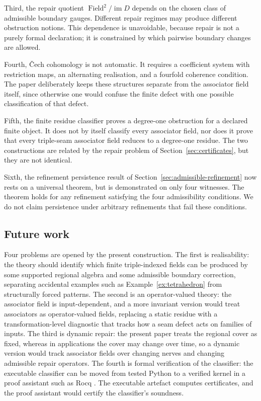 \documentclass[11pt]{article}
\newcommand{\im}{\operatorname{im}}
\newcommand{\Field}{\operatorname{Field}}
\begin{document}
Third, the repair quotient \(\Field^2/\im D\) depends on the chosen class of admissible boundary gauges. Different repair regimes may produce different obstruction notions. This dependence is unavoidable, because repair is not a purely formal declaration; it is constrained by which pairwise boundary changes are allowed.

Fourth, \v{C}ech cohomology is not automatic. It requires a coefficient system with restriction maps, an alternating realisation, and a fourfold coherence condition. The paper deliberately keeps these structures separate from the associator field itself, since otherwise one would confuse the finite defect with one possible classification of that defect.

Fifth, the finite residue classifier proves a degree-one obstruction for a declared finite object. It does not by itself classify every associator field, nor does it prove that every triple-seam associator field reduces to a degree-one residue. The two constructions are related by the repair problem of Section~\ref{sec:certificates}, but they are not identical.

Sixth, the refinement persistence result of Section~\ref{sec:admissible-refinement} now rests on a universal theorem, but is demonstrated on only four witnesses. The theorem holds for any refinement satisfying the four admissibility conditions. We do not claim persistence under arbitrary refinements that fail these conditions.

\subsection{Future work}

Four problems are opened by the present construction. The first is realisability: the theory should identify which finite triple-indexed fields can be produced by some supported regional algebra and some admissible boundary correction, separating accidental examples such as Example~\ref{ex:tetrahedron} from structurally forced patterns. The second is an operator-valued theory: the associator field is input-dependent, and a more invariant version would treat associators as operator-valued fields, replacing a static residue with a transformation-level diagnostic that tracks how a seam defect acts on families of inputs. The third is dynamic repair: the present paper treats the regional cover as fixed, whereas in applications the cover may change over time, so a dynamic version would track associator fields over changing nerves and changing admissible repair operators. The fourth is formal verification of the classifier: the executable classifier can be moved from tested Python to a verified kernel in a proof assistant such as Rocq \cite{Rocq2025}. The executable artefact computes certificates, and the proof assistant would certify the classifier's soundness.
\end{document}

